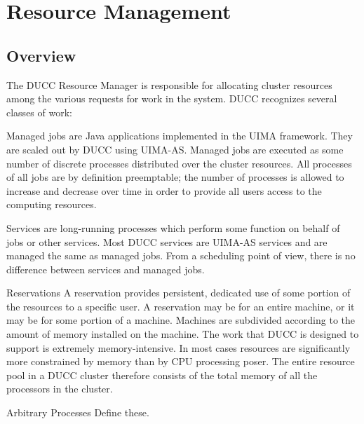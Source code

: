 \chapter{Resource Management}

    \section{Overview}

    The DUCC Resource Manager is responsible for allocating cluster resources among the various 
    requests for work in the system. DUCC recognizes several classes of work: 

    \begin{description}
        \item[Managed Jobs]
            Managed jobs are Java applications implemented in the UIMA framework. 
            They are scaled out by DUCC using UIMA-AS. Managed jobs are executed as some 
            number of discrete processes distributed over the cluster resources. All processes of all jobs 
            are by definition preemptable; the number of processes is allowed to increase and decrease 
            over time in order to provide all users access to the computing resources. 
        \item[Services]
            Services are long-running processes which perform some function on behalf of 
            jobs or other services. Most DUCC services are UIMA-AS services and are managed the 
            same as managed jobs. From a scheduling point of view, there is no difference between 
            services and managed jobs. 

        \item{Reservations}
            A reservation provides persistent, dedicated use of some portion of the 
            resources to a specific user. A reservation may be for an entire machine, or it may be for 
            some portion of a machine. Machines are subdivided according to the amount of memory 
            installed on the machine. 
            The work that DUCC is designed to support is extremely memory-intensive. In most cases 
            resources are significantly more constrained by memory than by CPU processing poser. The entire 
            resource pool in a DUCC cluster therefore consists of the total memory of all the processors in the           
            cluster. 

        \item{Arbitrary Processes}
            \todo Define these.
      \end{description}
          

